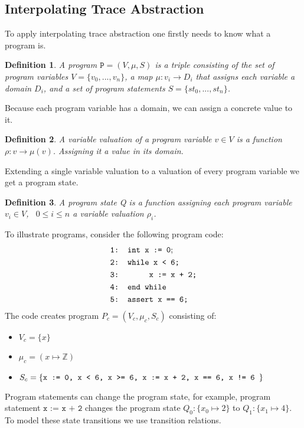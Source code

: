 \documentclass{article}
\newtheorem{mydef}{Definition}
\begin{document}
\subsection{Interpolating Trace Abstraction}
To apply interpolating trace abstraction one firstly needs to know what a program is.
\begin{mydef}
	A program $\texttt{P} = (V, \mu, S)$ is a triple consisting of the set of program variables $V = \{v_0, ..., v_n\}$, a map $\mu: v_i \rightarrow D_i$ that assigns each variable a domain $D_i$, and a set of program statements $S = \{st_0, ..., st_n\}$.
\end{mydef}
Because each program variable has a domain, we can assign a concrete value to it.
\begin{mydef}
	A variable valuation of a program variable $v \in V$ is a function $\rho: v \rightarrow \mu(v)$. Assigning it a value in its domain.
\end{mydef}
Extending a single variable valuation to a valuation of every program variable we get a program state.
\begin{mydef}
	A program state Q is a function assigning each program variable $v_i \in V$, \ $0 \leq i \leq n$ a variable valuation $\rho_i$. 
\end{mydef}
To illustrate programs, consider the following program code:
	\begin{align*}
		&\texttt{1: int x := 0}; \\
		&\texttt{2: while x < 6;} \\
		&\texttt{3: \hspace*{2em} x := x + 2;} \\
		&\texttt{4: end while} \\
		&\texttt{5: assert x == 6;}
	\end{align*}
	\label{fig:square}
\vspace*{1cm}
The code creates program $P_c = (V_c, \mu_c, S_c)$ consisting of:
\begin{itemize}
	\item $V_c = \{x\}$
	\item $\mu_c =(x \mapsto \mathbb{Z}) $
	\item $S_c = \{ \texttt{x := 0, \texttt{x < 6}, \texttt{x >= 6}, \texttt{x := x + 2}, \texttt{x == 6}, \texttt{x != 6} }\}$
\end{itemize}
Program statements can change the program state, for example, program statement $\texttt{x := x + 2}$ changes the program state $Q_0: \{ x_0 \mapsto 2\}$ to $Q_1: \{x_1 \mapsto 4\}$. To model these state transitions we use transition relations.
\end{document}
